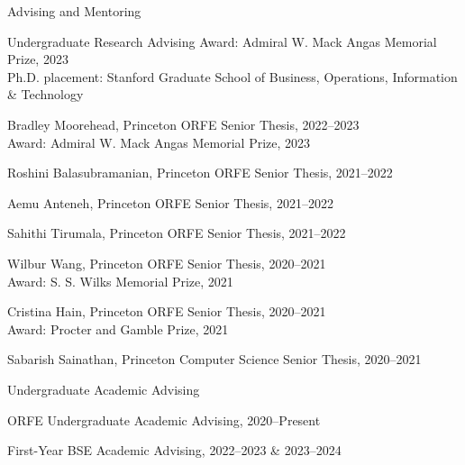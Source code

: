 \documentclass{resume}
\begin{document}
\begin{rSection}{Advising and Mentoring}
\begin{rSubsection}{Undergraduate Research Advising}{}{}{}
{Award: Admiral W. Mack Angas Memorial Prize, 2023 \\
Ph.D. placement: Stanford Graduate School of Business, Operations, Information \& Technology}
\item {Bradley Moorehead, Princeton ORFE Senior Thesis, 2022--2023 \\
Award: Admiral W. Mack Angas Memorial Prize, 2023}
\item {Roshini Balasubramanian, Princeton ORFE Senior Thesis, 2021--2022}
\item {Aemu Anteneh, Princeton ORFE Senior Thesis, 2021--2022}
\item {Sahithi Tirumala, Princeton ORFE Senior Thesis, 2021--2022}
\item {Wilbur Wang, Princeton ORFE Senior Thesis, 2020--2021 \\
Award: S. S. Wilks Memorial Prize, 2021}
\item {Cristina Hain, Princeton ORFE Senior Thesis, 2020--2021 \\
Award: Procter and Gamble Prize, 2021}
\item {Sabarish Sainathan, Princeton Computer Science Senior Thesis, 2020--2021}
\end{rSubsection}

\begin{rSubsection}{Undergraduate Academic Advising}{}{}{}
\item ORFE Undergraduate Academic Advising, 2020--Present
\item First-Year BSE Academic Advising, 2022--2023 \& 2023--2024
\end{rSubsection}

\end{rSection}


\end{document}
